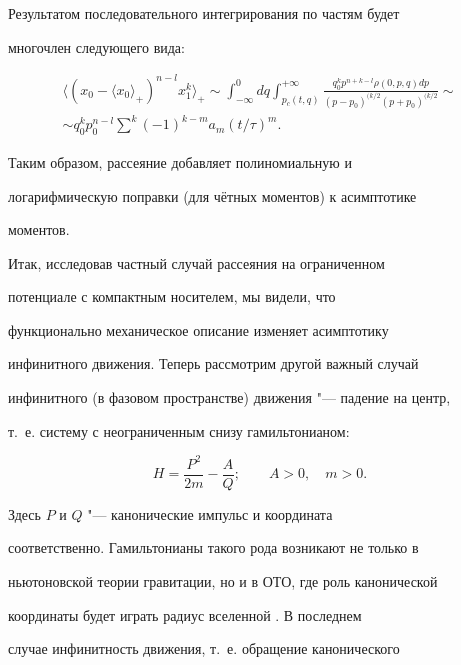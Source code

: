 Результатом  последовательного интегрирования по частям будет

многочлен следующего вида:

\begin{multline}

\langle(x_0-\langle

x_0\rangle_{+})^{n-l}x_1^k\rangle_{+}\sim\int_{-\infty}^{0}

dq\int_{p_c(t,q)}^{+\infty}\frac{q^k_0p^{n+k-l}\rho

(0,p,q)dp}{(p-p_0)^{(k/2}(p+p_0)^{(k/2}}\sim\\

\sim q^k_0p^{n-l}_0\sum_{}^{k}(-1)^{k-m} a_m({t}/{\tau})^m.

\end{multline}



 Таким образом, рассеяние добавляет полиномиальную и

 логарифмическую поправки (для чётных моментов) к асимптотике

 моментов.

 

\smallskip

 


Итак, исследовав частный случай  рассеяния на ограниченном

потенциале с компактным носителем, мы видели, что

функционально механическое описание изменяет асимптотику

инфинитного движения. Теперь рассмотрим другой  важный случай

инфинитного (в фазовом пространстве) движения "--- падение на центр,

т.~е. систему с неограниченным снизу гамильтонианом:

$$

H=\frac{P^2}{2m} -\frac{A}{Q};\qquad A>0,\quad    m>0.

$$

Здесь $P$ и $Q$ "--- канонические импульс и координата

соответственно. Гамильтонианы такого рода возникают не только в

ньютоновской теории гравитации, но и в ОТО, где роль канонической

координаты будет играть радиус вселенной \cite{MTW}. В последнем

случае инфинитность движения, т.~е. обращение канонического


